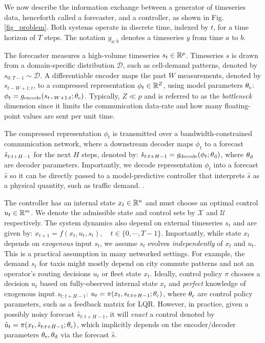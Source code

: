 We now describe the information exchange between a generator of timeseries data, henceforth called a forecaster, and a controller, as shown in Fig. \ref{fig_problem}. Both systems operate in discrete time, indexed by $t$, for a time horizon of $T$ steps. The notation $y_{a:b}$ denotes a timeseries $y$ from time $a$ to $b$.

The forecaster measures a high-volume timeseries $s_t \in \mathbb{R}^p$. Timeseries $s$ is drawn from a domain-specific distribution $\mathcal{D}$, such as cell-demand patterns, denoted by $s_{0:T-1} \sim \mathcal{D}$. A differentiable encoder maps the past $W$ measurements, denoted by $s_{t-W+1:t}$, to a compressed representation $\phi_t \in \mathbb{R}^Z$, using model parameters $\theta_{\mathrm{e}}$: $\phi_t = g_{\mathrm{encode}}(s_{t-W+1:t}; \theta_{\mathrm{e}})$. Typically, $Z\ll p$ and is referred to as the \textit{bottleneck} dimension since it limits the communication data-rate and how many floating-point values are sent per unit time.


The compressed representation $\phi_t$ is transmitted over a bandwidth-constrained communication network, where a downstream decoder maps $\phi_t$ to a forecast $\hat{s}_{t:t+H-1}$ for the next $H$ steps, denoted by: $\hat{s}_{t:t+H-1} = g_{\mathrm{decode}}(\phi_t; \theta_{\mathrm{d}})$,  
where $\theta_{\mathrm{d}}$ are decoder parameters. Importantly, we decode representation $\phi_t$ into a forecast $\hat{s}$ so it can be directly passed to a model-predictive controller that interprets $\hat{s}$ as a physical quantity, such as traffic demand. 
.


The controller has an internal state $x_t \in \mathbb{R}^n$ and must choose an optimal control $u_t \in \mathbb{R}^m$. We denote the admissible state and control sets by $\mathcal{X}$ and $\mathcal{U}$ respectively. The system dynamics also depend on external timeseries $s_t$ and are given by:
$x_{t+1} = f(x_t, u_t, s_t), \quad t \in \{0, \cdots, T-1\}$.
Importantly, while state $x_t$ depends on \textit{exogenous} input $s_t$, we assume $s_t$ evolves \textit{independently} of $x_t$ and $u_t$. This is a practical assumption in many networked settings. For example, the demand $s_t$ for taxis might mostly depend on city commute patterns and not an operator's routing decisions $u_t$ or fleet state $x_t$.
Ideally, control policy $\pi$ chooses a decision $u_t$ based on fully-observed internal state $x_t$ and \textit{perfect} knowledge of exogenous input $s_{t:t+H-1}$:
$u_t = \pi(x_t, s_{t:t+H-1}; \theta_{\mathrm{c}})$, 
where $\theta_{\mathrm{c}}$ are control policy parameters, such as a feedback matrix for LQR. However, in practice, given a possibly noisy forecast $\hat{s}_{t:t+H-1}$, it will \textit{enact} a control denoted by $\hat{u}_t = \pi(x_t, \hat{s}_{t:t+H-1}; \theta_{\mathrm{c}})$, which implicitly depends on the encoder/decoder parameters $\theta_{\mathrm{e}},\theta_{\mathrm{d}}$ via the forecast $\hat{s}$.

